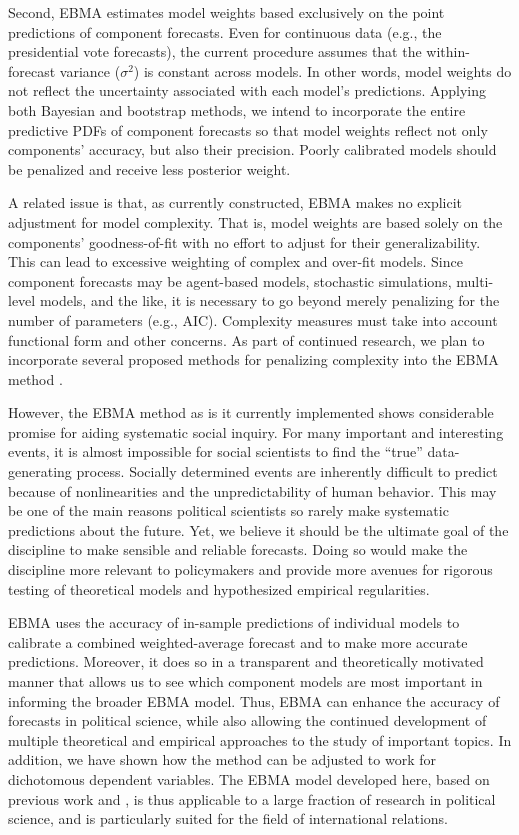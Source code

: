 Second, EBMA estimates model weights based exclusively on the point
predictions of component forecasts.  Even for continuous data (e.g.,
the presidential vote forecasts), the current procedure assumes that
the within-forecast variance ($\sigma^2$) is constant across models.
In other words, model weights do not reflect the uncertainty
associated with each model's predictions.  Applying both Bayesian and
bootstrap methods, we intend to incorporate the entire predictive PDFs
of component forecasts so that model weights reflect not only
components' accuracy, but also their precision.  Poorly calibrated
models should be penalized and receive less posterior weight.

A related issue is that, as currently constructed, EBMA makes no
explicit adjustment for model complexity. That is, model weights are
based solely on the components’ goodness-of-fit with no effort to
adjust for their generalizability. This can lead to excessive
weighting of complex and over-fit models. Since component forecasts
may be agent-based models, stochastic simulations, multi-level models,
and the like, it is necessary to go beyond merely penalizing for the
number of parameters (e.g., AIC). Complexity measures must take into
account functional form and other concerns. As part of continued
research, we plan to incorporate several proposed methods for
penalizing complexity into the EBMA method \citep[c.f.,][]{Pitt:2002a,
  Pitt:2002b, Spiegelhalter:2002}.

However, the EBMA method as is it currently implemented shows
considerable promise for aiding systematic social inquiry.  For many
important and interesting events, it is almost impossible for social
scientists to find the ``true'' data-generating process.  Socially
determined events are inherently difficult to predict because of
nonlinearities and the unpredictability of human behavior.  This may
be one of the main reasons political scientists so rarely make
systematic predictions about the future. Yet, we believe it should be
the ultimate goal of the discipline to make sensible and reliable
forecasts.  Doing so would make the discipline more relevant to
policymakers and provide more avenues for rigorous testing of
theoretical models and hypothesized empirical regularities.

EBMA uses the accuracy of in-sample predictions of individual models
to calibrate a combined weighted-average forecast and to make more
accurate predictions.  Moreover, it does so in a transparent and
theoretically motivated manner that allows us to see which component
models are most important in informing the broader EBMA model.  Thus,
EBMA can enhance the accuracy of forecasts in political science, while
also allowing the continued development of multiple theoretical and
empirical approaches to the study of important topics. In addition, we
have shown how the method can be adjusted to work for dichotomous
dependent variables.  The EBMA model developed here, based on previous
work \citet{Sloughter:2007} and \citet{Sloughter:2010}, is thus
applicable to a large fraction of research in political science, and
is particularly suited for the field of international relations.


